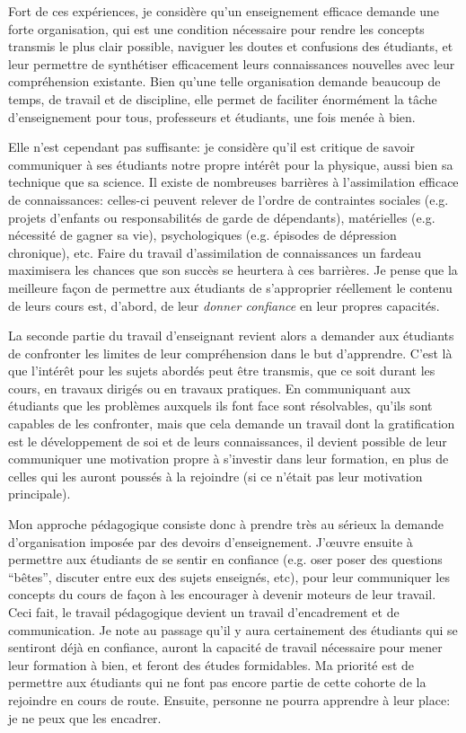\pg
Fort de ces exp\'eriences, je consid\`ere qu'un enseignement efficace demande une forte organisation, qui est une condition n\'ecessaire pour rendre les concepts transmis le plus clair possible, naviguer les doutes et confusions des \'etudiants, et leur permettre de synth\'etiser efficacement leurs connaissances nouvelles avec leur compr\'ehension existante. Bien qu'une telle organisation demande beaucoup de temps, de travail et de discipline, elle permet de faciliter \'enorm\'ement la t\^ache d'enseignement pour tous, professeurs et \'etudiants, une fois men\'ee \`a bien.

\pg
Elle n'est cependant pas suffisante: je consid\`ere qu'il est critique de savoir communiquer \`a ses \'etudiants notre propre int\'er\^et pour la physique, aussi bien sa technique que sa science. Il existe de nombreuses barri\`eres \`a l'assimilation efficace de connaissances: celles-ci peuvent relever de l'ordre de contraintes sociales (e.g. projets d'enfants ou responsabilit\'es de garde de d\'ependants), mat\'erielles (e.g. n\'ecessit\'e de gagner sa vie), psychologiques (e.g. \'episodes de d\'epression chronique), etc. Faire du travail d'assimilation de connaissances un fardeau maximisera les chances que son succ\`es se heurtera \`a ces barri\`eres. Je pense que la meilleure fa\c{c}on de permettre aux \'etudiants de s'approprier r\'eellement le contenu de leurs cours est, d'abord, de leur \textit{donner confiance} en leur propres capacit\'es. 

\pg
La seconde partie du travail d'enseignant revient alors a demander aux \'etudiants de confronter les limites de leur compr\'ehension dans le but d'apprendre. C'est l\`a que l'int\'er\^et pour les sujets abord\'es peut \^etre transmis, que ce soit durant les cours, en travaux dirig\'es ou en travaux pratiques. En communiquant aux \'etudiants que les probl\`emes auxquels ils font face sont r\'esolvables, qu'ils sont capables de les confronter, mais que cela demande un travail dont la gratification est le d\'eveloppement de soi et de leurs connaissances, il devient possible de leur communiquer une motivation propre \`a s'investir dans leur formation, en plus de celles qui les auront pouss\'es \`a la rejoindre (si ce n'\'etait pas leur motivation principale). 

\pg
Mon approche p\'edagogique consiste donc \`a prendre tr\`es au s\'erieux la demande d'organisation impos\'ee par des devoirs d'enseignement. J'{\oe}uvre ensuite \`a permettre aux \'etudiants de se sentir en confiance (e.g. oser poser des questions ``b\^etes'', discuter entre eux des sujets enseign\'es, etc), pour leur communiquer les concepts du cours de fa\c{c}on \`a les encourager \`a devenir moteurs de leur travail. Ceci fait, le travail p\'edagogique devient un travail d'encadrement et de communication. Je note au passage qu'il y aura certainement des \'etudiants qui se sentiront d\'ej\`a en confiance, auront la capacit\'e de travail n\'ecessaire pour mener leur formation \`a bien, et feront des \'etudes formidables. Ma priorit\'e est de permettre aux \'etudiants qui ne font pas encore partie de cette cohorte de la rejoindre en cours de route. Ensuite, personne ne pourra apprendre \`a leur place: je ne peux que les encadrer.


